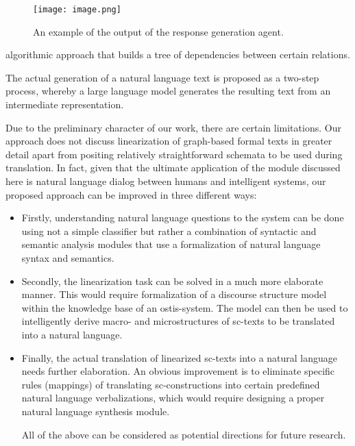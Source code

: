 \documentclass[a4paper]{article}
\begin{document}
\begin{figure}
    \centering
    \texttt{[image: image.png]}
    \caption{ An example of the output of the response generation agent.}
    
\end{figure}


\begin{multicols}{2}


\normalsize
algorithmic approach that builds a tree of dependencies
between certain relations.\par
The actual generation of a natural language text is
proposed as a two-step process, whereby a large language
model generates the resulting text from an intermediate
representation.\par
Due to the preliminary character of our work, there
are certain limitations. Our approach does not discuss
linearization of graph-based formal texts in greater detail
apart from positing relatively straightforward schemata
to be used during translation. In fact, given that the
ultimate application of the module discussed here is
natural language dialog between humans and intelligent
systems, our proposed approach can be improved in three
different ways:

\begin{itemize}[noitemsep]%
\item Firstly, understanding natural language questions to
the system can be done using not a simple classifier
but rather a combination of syntactic and semantic
analysis modules that use a formalization of natural
language syntax and semantics.
\item Secondly, the linearization task can be solved in a
much more elaborate manner. This would require
formalization of a discourse structure model within
the knowledge base of an ostis-system. The model
can then be used to intelligently derive macro- and
microstructures of sc-texts to be translated into a natural language.
\item Finally, the actual translation of linearized sc-texts
into a natural language needs further elaboration.
An obvious improvement is to eliminate specific
rules (mappings) of translating sc-constructions into
certain predefined natural language verbalizations,
which would require designing a proper natural
language synthesis module.
\par
All of the above can be considered as potential directions for future research.
\end{itemize}


\end{multicols}
\end{document}
